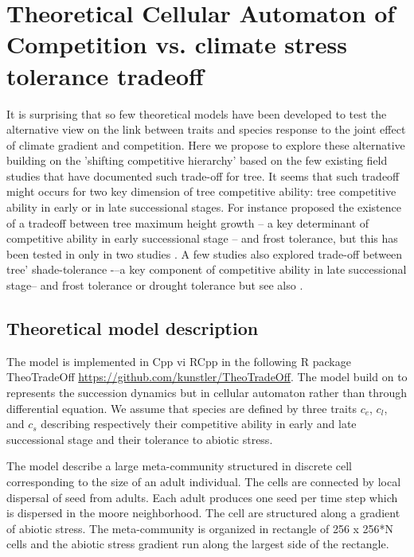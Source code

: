 \documentclass[a4paper,11pt]{article}
\begin{document}
\clearpage

\section{Theoretical Cellular Automaton of Competition vs. climate stress tolerance tradeoff}

It is surprising that so few theoretical models have been developed to test the alternative view on the link between traits and species response to the joint effect of climate gradient and competition.
Here we propose to explore these alternative building on the 'shifting competitive hierarchy' based on the few existing field studies that have documented such trade-off for tree. It seems that such tradeoff might occurs for two key dimension of tree competitive ability: tree competitive ability in early or in late successional stages. For instance \citep{Loehle-1998} proposed the existence of a tradeoff between tree maximum height growth – a key determinant of competitive ability in early successional stage – and frost tolerance, but this has been tested in only in two studies \citep{Koehler-2012,Savage-2013}. A few studies also explored trade-off between tree’ shade-tolerance -–a key component of competitive ability in late successional stage-- and frost tolerance \citep{Lusk-2013} or drought tolerance \citep[see][]{Smith-1989,Niinemets-2006} but see also \citep{Sack-2004,Markesteijn-2011}.


\subsection{Theoretical model description}

The model is implemented in Cpp vi RCpp in the following R package
TheoTradeOff \url{https://github.com/kunstler/TheoTradeOff}. The
model build on \citet{Pacala-1998} to represents the succession
dynamics but in cellular automaton rather than through
differential equation. We assume that species are defined by three
traits $c_e$, $c_l$, and $c_s$ describing
respectively their competitive ability in early and late successional stage and their
tolerance to abiotic stress.

The model describe a large meta-community structured in discrete cell
corresponding  to the  size of  an  adult individual.   The cells  are
connected  by local  dispersal  of  seed from  adults. Each adult
produces one seed per time step which is dispersed in the moore
neighborhood.  The cell  are structured along a  gradient of
abiotic stress. The meta-community is organized in rectangle of
256 x 256*N cells  and the abiotic stress  gradient run along the
largest side of the rectangle.
\end{document}
